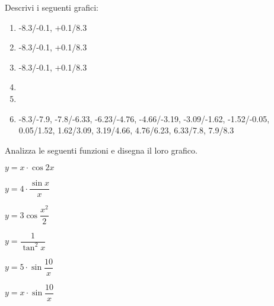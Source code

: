 \bigskip

\begin{esercizio}\label{ese:stufun.7g}
Descrivi i seguenti grafici:
\begin{multicols}{2}
 \begin{enumerate} [left=0pt, label=\alph*)]
  \item \myp 
{}
{-8.3/-0.1, +0.1/8.3} %
  \item \myp 
{} 
{-8.3/-0.1, +0.1/8.3} %
  \item \myp 
{} 
{-8.3/-0.1, +0.1/8.3} %
\vspace{1mm}
  \item \myp 
{} %
  \item \myp 
{} %
  \item \myp 
{}
{-8.3/-7.9, -7.8/-6.33, -6.23/-4.76, -4.66/-3.19, -3.09/-1.62, -1.52/-0.05, 
 0.05/1.52, 1.62/3.09, 3.19/4.66, 4.76/6.23, 6.33/7.8, 7.9/8.3} %
 \end{enumerate}
\end{multicols}
\end{esercizio}

\begin{esercizio}\label{ese:stufun.7e}
Analizza le seguenti funzioni e disegna il loro grafico.
\begin{multicols}{3}
 \begin{enumeratea}
  \item \(y = x \cdot \cos 2x\) \\ [.5em] %
  \item \(y = 4 \cdot \dfrac{\sin x}{x}\) %
  \item \(y = 3 \cos {\dfrac{x^2}{2}}\) \\ %
  \item \(y = \dfrac{1}{\tan^2 x}\) %
  \item \(y = 5 \cdot \sin \dfrac{10}{x}\) \\ %
  \item \(y = x \cdot \sin \dfrac{10}{x}\) %
 \end{enumeratea}
\end{multicols}
\end{esercizio}



